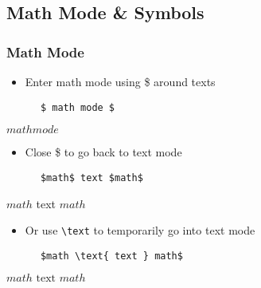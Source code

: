 \documentclass{beamer}
\begin{document}
\subsection{Math Mode \& Symbols}
\begin{frame}[fragile]
\frametitle{Math Mode}
  \begin{itemize}
    \item Enter math mode using \$ around texts
  \end{itemize}
  \begin{multicols}{2}
    \begin{verbatim}
      $ math mode $
    \end{verbatim}
    \columnbreak
    $math mode$
  \end{multicols}

  \begin{itemize}
    \item Close \$ to go back to text mode
  \end{itemize}
  \begin{multicols}{2}
    \begin{verbatim}
      $math$ text $math$
    \end{verbatim}
    \columnbreak
    $math$ text $math$
  \end{multicols}

  \begin{itemize}
    \item Or use \verb+\text+ to temporarily go into text mode
  \end{itemize}
  \begin{multicols}{2}
    \begin{verbatim}
      $math \text{ text } math$
    \end{verbatim}
    \columnbreak
    $math \text{ text } math$
  \end{multicols}
\end{frame}
\end{document}
